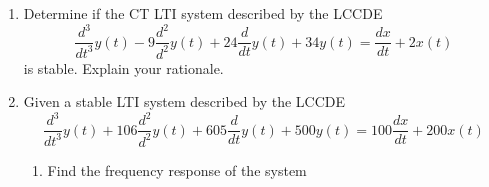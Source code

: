 \documentclass{article}
\begin{document}
\begin{enumerate}
    \item Determine if the CT LTI system described by the LCCDE
    \begin{equation}
        \frac{d^3}{dt^3}y(t)-9\frac{d^2}{d^2}y(t) + 24\frac{d}{dt}y(t)+34y(t) = \frac{dx}{dt} +2x(t)
    \end{equation}
    is stable. Explain your rationale.
    \newpage
    \item Given a stable LTI system described by the LCCDE
    \begin{equation}
        \frac{d^3}{dt^3}y(t)+106\frac{d^2}{d^2}y(t) + 605\frac{d}{dt}y(t)+500y(t) = 100\frac{dx}{dt} +200x(t)
    \end{equation}
    \begin{enumerate}
        \item Find the frequency response of the system
        

\end{enumerate}
\end{enumerate}
\end{document}
